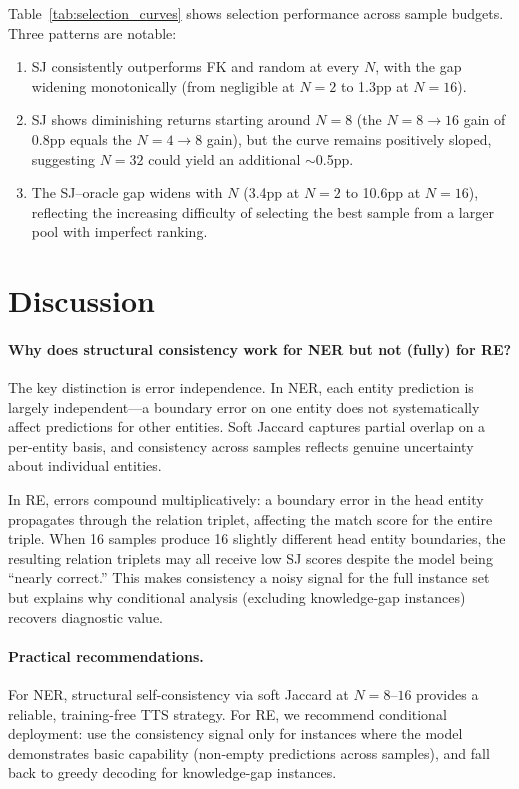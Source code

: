 \documentclass[11pt,a4paper]{article}
\begin{document}
Table~\ref{tab:selection_curves} shows selection performance across sample budgets. Three patterns are notable:
\begin{enumerate}
    \item SJ consistently outperforms FK and random at every $N$, with the gap widening monotonically (from negligible at $N\!=\!2$ to 1.3pp at $N\!=\!16$).
    \item SJ shows diminishing returns starting around $N\!=\!8$ (the $N\!=\!8 \to 16$ gain of 0.8pp equals the $N\!=\!4 \to 8$ gain), but the curve remains positively sloped, suggesting $N\!=\!32$ could yield an additional ${\sim}$0.5pp.
    \item The SJ--oracle gap widens with $N$ (3.4pp at $N\!=\!2$ to 10.6pp at $N\!=\!16$), reflecting the increasing difficulty of selecting the best sample from a larger pool with imperfect ranking.
\end{enumerate}

\section{Discussion}

\paragraph{Why does structural consistency work for NER but not (fully) for RE?}
The key distinction is error independence. In NER, each entity prediction is largely independent---a boundary error on one entity does not systematically affect predictions for other entities. Soft Jaccard captures partial overlap on a per-entity basis, and consistency across samples reflects genuine uncertainty about individual entities.

In RE, errors compound multiplicatively: a boundary error in the head entity propagates through the relation triplet, affecting the match score for the entire triple. When 16 samples produce 16 slightly different head entity boundaries, the resulting relation triplets may all receive low SJ scores despite the model being ``nearly correct.'' This makes consistency a noisy signal for the full instance set but explains why conditional analysis (excluding knowledge-gap instances) recovers diagnostic value.

\paragraph{Practical recommendations.}
For NER, structural self-consistency via soft Jaccard at $N\!=\!8$--$16$ provides a reliable, training-free TTS strategy. For RE, we recommend conditional deployment: use the consistency signal only for instances where the model demonstrates basic capability (non-empty predictions across samples), and fall back to greedy decoding for knowledge-gap instances.
\end{document}
